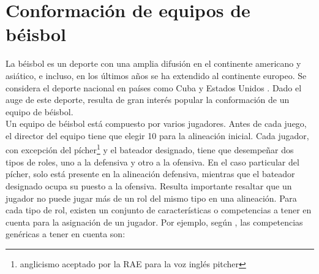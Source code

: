 
\section{Conformación de equipos de béisbol} \label{ej-pel}

La béisbol es un deporte con una amplia difusión en el continente americano y asiático, e incluso, en los últimos años se ha extendido al continente europeo. Se considera el deporte nacional en países como Cuba y Estados Unidos \cite{INEFI2020}. Dado el auge de este deporte, resulta de gran interés popular la conformación de un equipo de béisbol.\\

Un equipo de béisbol está compuesto por varios jugadores. Antes de cada juego, el director del equipo tiene que elegir 10 para la alineación inicial. Cada jugador, con excepción del pícher\footnote{anglicismo aceptado por la RAE para la voz inglés pitcher} y el bateador designado, tiene que desempeñar dos tipos de roles, uno a la defensiva y otro a la ofensiva. En el caso particular del pícher, solo está presente en la alineación defensiva, mientras que el bateador designado ocupa su puesto a la ofensiva. Resulta importante resaltar que un jugador no puede jugar más de un rol del mismo tipo en una alineación. Para cada tipo de rol, existen un conjunto de características o competencias a tener en cuenta para la asignación de un jugador. Por ejemplo, según \cite{Smith1995},  las competencias genéricas a tener en cuenta son:


